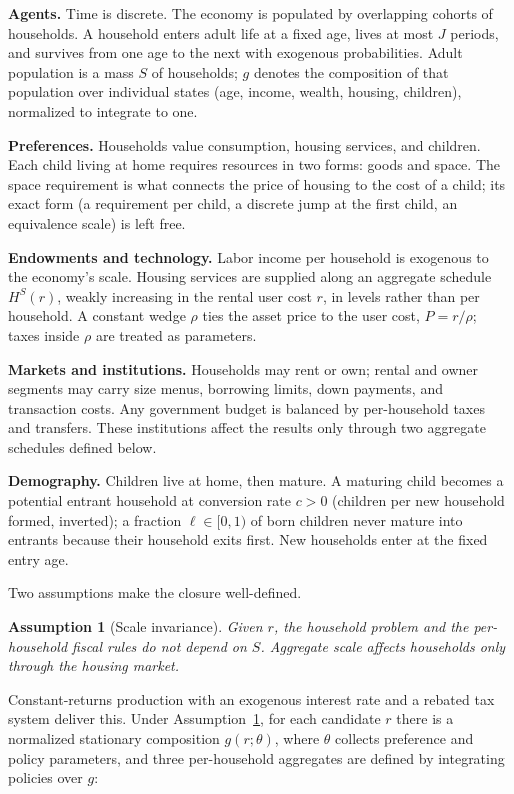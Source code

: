 \documentclass[11pt]{article}
\newtheorem{assumption}{Assumption}
\theoremstyle{definition}
\begin{document}
\textbf{Agents.} Time is discrete. The economy is populated by overlapping
cohorts of households. A household enters adult life at a fixed age, lives at
most $J$ periods, and survives from one age to the next with exogenous
probabilities. Adult population is a mass $S$ of households; $g$ denotes the
composition of that population over individual states (age, income, wealth,
housing, children), normalized to integrate to one.

\textbf{Preferences.} Households value consumption, housing services, and
children. Each child living at home requires resources in two forms: goods and
space. The space requirement is what connects the price of housing to the cost
of a child; its exact form (a requirement per child, a discrete jump at the
first child, an equivalence scale) is left free.

\textbf{Endowments and technology.} Labor income per household is exogenous to
the economy's scale. Housing services are supplied along an aggregate schedule
$H^S(r)$, weakly increasing in the rental user cost $r$, in levels rather than
per household. A constant wedge $\rho$ ties the asset price to the user cost,
$P=r/\rho$; taxes inside $\rho$ are treated as parameters.

\textbf{Markets and institutions.} Households may rent or own; rental and owner
segments may carry size menus, borrowing limits, down payments, and
transaction costs. Any government budget is balanced by per-household taxes
and transfers. These institutions affect the results only through two
aggregate schedules defined below.

\textbf{Demography.} Children live at home, then mature. A maturing child
becomes a potential entrant household at conversion rate $c>0$ (children per
new household formed, inverted); a fraction $\ell\in[0,1)$ of born children
never mature into entrants because their household exits first. New households
enter at the fixed entry age.

Two assumptions make the closure well-defined.

\begin{assumption}[Scale invariance]\label{ass:scale}
Given $r$, the household problem and the per-household fiscal rules do not
depend on $S$. Aggregate scale affects households only through the housing
market.
\end{assumption}

Constant-returns production with an exogenous interest rate and a rebated tax
system deliver this. Under Assumption~\ref{ass:scale}, for each candidate $r$
there is a normalized stationary composition $g(r;\theta)$, where $\theta$
collects preference and policy parameters, and three per-household aggregates
are defined by integrating policies over $g$:
\end{document}
